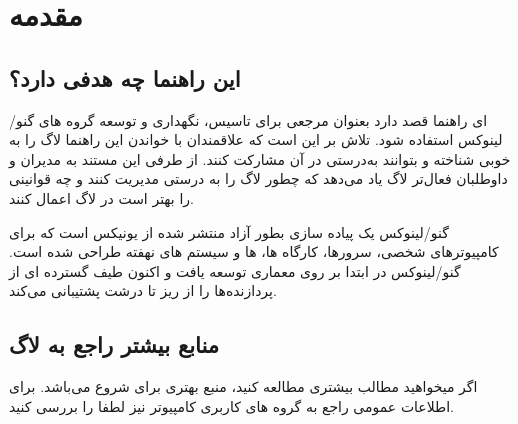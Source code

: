 \section{مقدمه}

\subsection{این راهنما چه هدفی دارد؟}

ای راهنما قصد دارد بعنوان مرجعی برای تاسیس، نگهداری و توسعه گروه های گنو/لینوکس استفاده شود.
تلاش بر این است که علاقمندان با خواندن این راهنما لاگ را به خوبی شناخته و بتوانند به‌درستی در آن
مشارکت کنند. از طرفی این مستند به مدیران و داوطلبان فعال‌تر لاگ یاد می‌دهد که چطور لاگ را به درستی
مدیریت کنند و چه قوانینی را بهتر است در لاگ اعمال کنند.

گنو/لینوکس یک پیاده سازی بطور آزاد منتشر شده از یونیکس است که برای کامپیوترهای شخصی،
سرورها، کارگاه ها،  ها و سیستم های نهفته طراحی شده است.
گنو/لینوکس در ابتدا بر روی معماری  توسعه یافت و اکنون طیف گسترده ای از پردازنده‌ها
را از ریز تا درشت پشتیبانی می‌کند.

%

\subsection{منابع بیشتر راجع به لاگ}

اگر میخواهید مطالب بیشتری مطالعه کنید،
منبع بهتری برای شروع می‌باشد. برای اطلاعات عمومی راجع به گروه های کاربری کامپیوتر نیز لطفا
را بررسی کنید.


